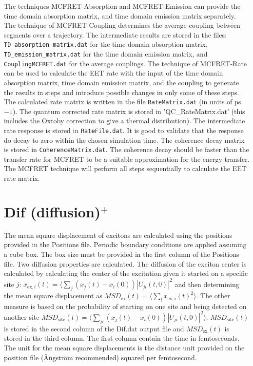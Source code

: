 The techniques MCFRET-Absorption and MCFRET-Emission can provide the time domain absorption matrix, and time domain emission matrix separately.
The technique of MCFRET-Coupling determines the average coupling between segments over a trajectory. The intermediate results are stored in the files:
 {\tt TD\_absorption\_matrix.dat} for the time domain absorption matrix, {\tt TD\_emission\_matrix.dat} for the time domain emission matrix, and  {\tt CouplingMCFRET.dat} for the average couplings. 
The technique of MCFRET-Rate can be used to calculate the EET rate with the input of the time domain absorption matrix, time domain emission matrix, and the coupling to generate the results in steps and introduce possible changes in only some of these steps.  The calculated rate matrix is written in the file {\tt RateMatrix.dat} (in units of ps${-1}$). The quantum corrected rate matrix is stored in 'QC\_RateMatrix.dat' (this includes the Oxtoby correction to give a thermal distribution). The intermediate  rate response is stored in {\tt RateFile.dat}. It is good to validate that the response do decay to zero within the chosen simulation time. The coherence decay matrix is stored in {\tt CoherenceMatrix.dat}. The coherence decay should be faster than the transfer rate for MCFRET to be a suitable approximation for the energy transfer.
The MCFRET technique will perform all steps sequentially to calculate the EET rate matrix.


\section{Dif (diffusion)$^{+}$}
The mean square displacement of excitons are calculated using the positions provided in the Positions file. Periodic boundary conditions are applied assuming a cube box. The box size must be provided in the first column of the Positions file.
Two diffusion properties are calculated. The diffusion of the exciton center is calculated by calculating the center of the excitation given it started on a specific site $j$: $x_{\textrm{ex},i}(t)=\langle \sum_j (x_j(t)-x_i(0)) |U_{ji}(t,0)|^2$ and then determining the mean square displacement as $MSD_{\textrm{ex}}(t)=\langle \sum_i  x_{\textrm{ex},i}(t)^2\rangle$. The other measure is based on the probability of starting on one site and being detected on another site $MSD_{\textrm{site}}(t)=\langle \sum_{ji} (x_j(t)-x_i(0))|U_{ji}(t,0)|^2\rangle$. $MSD_{\textrm{site}}(t)$ is stored in the second column of the Dif.dat output file and $MSD_{\textrm{ex}}(t)$ is stored in the third column. The first column contain the time in femtoseconds. The unit for the mean square displacements is the distance unit provided on the position file (\AA ngstr\"{o}m recommended) squared per femtosecond. 
